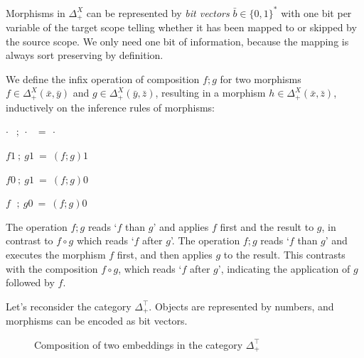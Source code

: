 \documentclass[runningheads]{llncs}
\begin{document}
\begin{remark}
  Morphisms in $Δ_+^X$ can be represented by \emph{bit vectors} $\bar{b} ∈ \{0, 1\}^*$ with one bit per variable of the target scope telling whether it has been mapped to or skipped by the source scope.
  We only need one bit of information, because the mapping is always sort preserving by definition.
\end{remark}
\begin{definition}
  We define the infix operation of composition $f;g$ for two morphisms $f ∈ Δ_+^X(\bar{x}, \bar{y})$ and $g ∈ Δ_+^X(\bar{y}, \bar{z})$, resulting in a morphism $h ∈ Δ_+^X(\bar{x}, \bar{z})$, inductively on the inference rules of morphisms:

  \quad $·  \ \ \, \, ; \ · \ \ \ = \ ·$

  \quad $f 1  \ ; \ g 1 \ = \ (f;g)1$

  \quad $f 0 \ ; \ g 1  \ = \ (f;g)0$

  \quad $f \ \ \, ; \ g 0 \ = \ (f;g)0$
\end{definition}
\begin{remark}
  The operation $f;g$ reads `$f$ than $g$' and applies $f$ first and the result to $g$, in contrast to $f ∘ g$ which reads `$f$ after $g$'.
  The operation $f;g$ reads `$f$ than $g$' and executes the morphism $f$ first, and then applies $g$ to the result.
  This contrasts with the composition $f ∘ g$, which reads `$f$ after $g$', indicating the application of $g$ followed by $f$.
\end{remark}
\begin{example}
  Let's reconsider the category $Δ_+^⊤$. Objects are represented by numbers, and morphisms can be encoded as bit vectors.
  \begin{figure}[h]
    \centering
    \caption{Composition of two embeddings in the category $Δ_+^⊤$}
    \label{fig:ex2}
  \end{figure}
\end{example}
\end{document}
